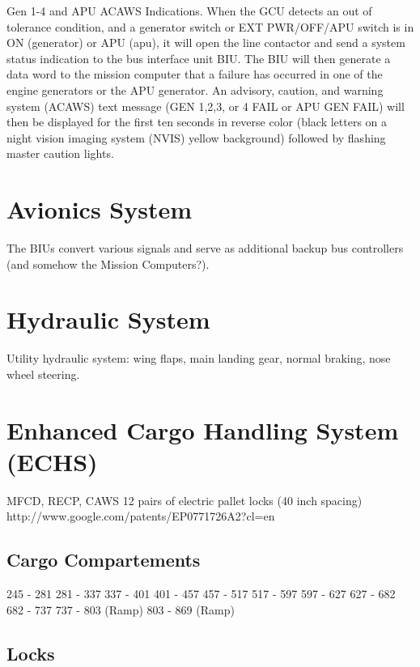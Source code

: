 Gen 1-4 and APU ACAWS Indications. When the GCU detects an out of tolerance condition, and a generator switch or EXT PWR/OFF/APU switch is in ON (generator) or APU (apu), it will open the line contactor and send a system status indication to the bus interface unit BIU. The
BIU will then generate a data word to the mission computer that a failure has occurred in one of the engine generators or the APU generator. An advisory, caution, and warning system (ACAWS) text message (GEN 1,2,3, or 4 FAIL or APU GEN FAIL) will then be displayed for the first ten
seconds in reverse color (black letters on a night vision imaging system (NVIS) yellow background) followed by flashing master caution lights.

\section{Avionics System}

The \gls{BIU}s convert various signals and serve as additional backup bus controllers (and somehow the Mission Computers?).

\section{Hydraulic System}

Utility hydraulic system: wing flaps, main landing gear, normal braking, nose wheel steering.

\section{Enhanced Cargo Handling System (ECHS)}
\label{sec:echs}

\gls{MFCD}, \gls{RECP}, \gls{CAWS} 12 pairs of electric pallet locks (40 inch spacing) http://www.google.com/patents/EP0771726A2?cl=en

\subsection{Cargo Compartements}

\begin{itemize}
   245 - 281
   281 - 337
   337 - 401
   401 - 457
   457 - 517
   517 - 597
   597 - 627
   627 - 682
   682 - 737
   737 - 803 (Ramp)
   803 - 869 (Ramp)
\end{itemize}

\subsection{Locks}


